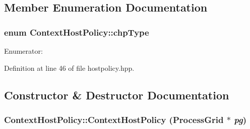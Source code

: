 \subsection{Member Enumeration Documentation}
\hypertarget{class_context_host_policy_a8050b2efb974f28cbabe561cb04989a1}{
\subsubsection[{chpType}]{\setlength{\rightskip}{0pt plus 5cm}enum {\bf ContextHostPolicy::chpType}}}
\label{class_context_host_policy_a8050b2efb974f28cbabe561cb04989a1}
\begin{Desc}
\item[Enumerator: ]\par
\begin{description}
\item[{\em 
\hypertarget{class_context_host_policy_a8050b2efb974f28cbabe561cb04989a1a39048ccb3419ff4d10c0fb37662b0ce3}{
PROC\_\-GROUP\_\-CYCLIC}
\label{class_context_host_policy_a8050b2efb974f28cbabe561cb04989a1a39048ccb3419ff4d10c0fb37662b0ce3}
}]\item[{\em 
\hypertarget{class_context_host_policy_a8050b2efb974f28cbabe561cb04989a1ad393362f6d0433881a2fa716cbda27e4}{
ALL\_\-ENTER}
\label{class_context_host_policy_a8050b2efb974f28cbabe561cb04989a1ad393362f6d0433881a2fa716cbda27e4}
}]\end{description}
\end{Desc}



Definition at line 46 of file hostpolicy.hpp.

\subsection{Constructor \& Destructor Documentation}
\hypertarget{class_context_host_policy_a6e46676fe884df637db21b89ca698966}{
\subsubsection[{ContextHostPolicy}]{\setlength{\rightskip}{0pt plus 5cm}ContextHostPolicy::ContextHostPolicy ({\bf ProcessGrid} $\ast$ {\em pg})}}
\label{class_context_host_policy_a6e46676fe884df637db21b89ca698966}


